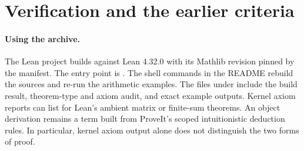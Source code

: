 \section{Verification and the earlier criteria}\label{sec:status}
\paragraph{Using the archive.}
The Lean project builds against Lean 4.32.0 with its Mathlib revision pinned by the manifest. The entry point is . The shell commands in the README rebuild the sources and re-run the arithmetic examples. The files under  include the build result, theorem-type and axiom audit, and exact example outputs. Kernel axiom reports can list  for Lean's ambient matrix or finite-sum theorems. An object derivation remains a term built from ProveIt's scoped intuitionistic deduction rules. In particular, kernel axiom output alone does not distinguish the two forms of proof.

